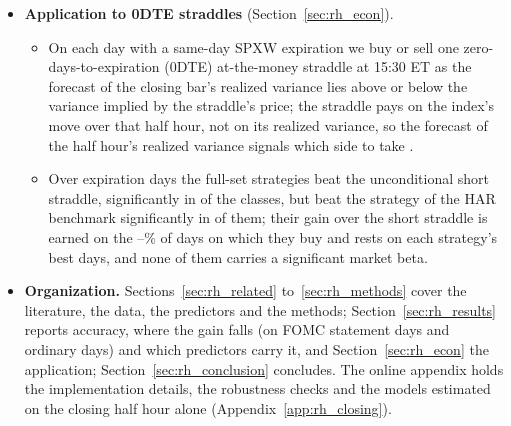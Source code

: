 \begin{itemize}
\begin{enumerate}
\begin{itemize}
      days with the largest excess squared error, all between \rhcaTopFirstBarOos{} and \rhcaTopLastBarOos, carry
      \rhcaLinTopShareBarOosRng\% of the full set's excess squared error in the penalized linear models and
      \rhcaTreeTopShareBarOosRng\% in the tree ensembles. Without the days from \rhcaCrashStart{} to \rhcaCrashEnd{}
      the full set has the lower mean squared error in \rhcaNMseLowerBarOosExCrash{} of the classes,
      \rhcaNMseLowerSigBarOosExCrash{} of them significantly.
    \end{itemize}
  \end{enumerate}
\item \textbf{Application to 0DTE straddles} (Section~\ref{sec:rh_econ}).
  \begin{itemize}
  \item On each day with a same-day SPXW expiration we buy or sell one zero-days-to-expiration (0DTE) at-the-money
    straddle at 15:30 ET as the forecast of the closing bar's realized variance lies above or below the variance
    implied by the straddle's price; the straddle pays on the index's move over that half hour, not on its realized
    variance, so the forecast of the half hour's realized variance signals which side to take
    \citep{EngleHongKaneNoh1993,NohEngleKane1994}.
  \item Over \rheSzDays{} expiration days the full-set strategies beat the unconditional short straddle,
    significantly in \rhemFullVsShortSig{} of the \rhorAfPairs{} classes, but beat the strategy of the HAR benchmark
    significantly in \rhemFullVsOlsHarSig{} of them; their gain over the short straddle is earned on the
    \rhedLongPctMin--\rhedLongPctMax\% of days on which they buy and rests on each strategy's \rhedNTop{} best days,
    and none of them carries a significant market beta.
  \end{itemize}
\item \textbf{Organization.} Sections~\ref{sec:rh_related} to~\ref{sec:rh_methods} cover the literature, the data,
  the predictors and the methods; Section~\ref{sec:rh_results} reports accuracy, where the gain falls (on FOMC
  statement days and ordinary days) and which predictors carry it, and Section~\ref{sec:rh_econ} the application;
  Section~\ref{sec:rh_conclusion} concludes. The online appendix holds the implementation details, the robustness
  checks and the models estimated on the closing half hour alone (Appendix~\ref{app:rh_closing}).
\end{itemize}


